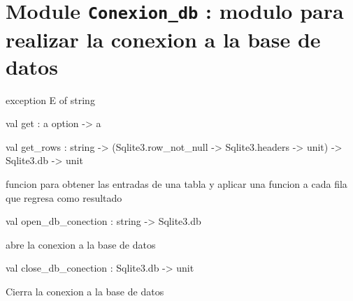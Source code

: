 \documentclass[11pt]{article}
\begin{document}
\tableofcontents
\section{Module {\tt{Conexion\_db}} : modulo para realizar la conexion a la base de datos}
\label{module:Conexion-underscoredb}




\ocamldocvspace{0.5cm}



\label{exception:Conexion-underscoredb.E}\begin{ocamldoccode}
exception E of string
\end{ocamldoccode}




\label{val:Conexion-underscoredb.get}\begin{ocamldoccode}
val get : {\textquotesingle}a option -> {\textquotesingle}a
\end{ocamldoccode}




\label{val:Conexion-underscoredb.get-underscorerows}\begin{ocamldoccode}
val get_rows :
  string ->
  (Sqlite3.row_not_null -> Sqlite3.headers -> unit) -> Sqlite3.db -> unit
\end{ocamldoccode}
\begin{ocamldocdescription}
funcion para obtener las entradas de una tabla y aplicar una funcion a cada
fila que regresa como resultado


\end{ocamldocdescription}




\label{val:Conexion-underscoredb.open-underscoredb-underscoreconection}\begin{ocamldoccode}
val open_db_conection : string -> Sqlite3.db
\end{ocamldoccode}
\begin{ocamldocdescription}
abre la conexion a la base de datos


\end{ocamldocdescription}




\label{val:Conexion-underscoredb.close-underscoredb-underscoreconection}\begin{ocamldoccode}
val close_db_conection : Sqlite3.db -> unit
\end{ocamldoccode}
\begin{ocamldocdescription}
Cierra la conexion a la base de datos


\end{ocamldocdescription}
\end{document}
